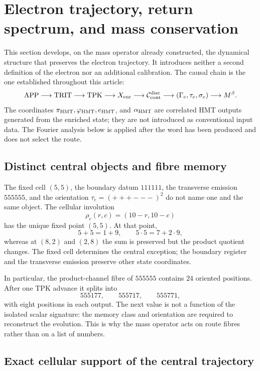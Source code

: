 \section{Electron trajectory, return spectrum, and mass conservation}
\label{vi:sec:trayectoria-espectral-masa}

This section develops, on the mass operator already constructed, the
dynamical structure that preserves the electron trajectory. It introduces
neither a second definition of the electron nor an additional calibration.
The causal chain is the one established throughout this article:
\[
 \mathrm{APP}\longrightarrow\mathrm{TRIT}\longrightarrow\mathrm{TPK}
 \longrightarrow X_{\rm enr}
 \longrightarrow\mathcal C_{\rm cont}^{\rm disc}
 \longrightarrow (\Gamma_e,\tau_e,\sigma_e)
 \longrightarrow M^\beta .
\]
The coordinates $\pi_{\rm HMT},\varphi_{\rm HMT},e_{\rm HMT}$, and
$\alpha_{\rm HMT}$ are correlated HMT outputs generated from the enriched
state; they are not introduced as conventional input data. The Fourier analysis
below is applied after the word has been produced and does not select the route.

\subsection{Distinct central objects and fibre memory}

The fixed cell $(5,5)$, the boundary datum $111111$, the transverse emission
$555555$, and the orientation $\tau_e=(+++---)^2$ do not name one and the
same object. The cellular involution
\[
 \rho_c(r,c)=(10-r,10-c)
\]
has the unique fixed point $(5,5)$. At that point,
\[
 5+5=1+9,\qquad 5\cdot5=7+2\cdot9,
\]
whereas at $(8,2)$ and $(2,8)$ the sum is preserved but the product quotient
changes. The fixed cell determines the central exception; the boundary
register and the transverse emission preserve other state coordinates.

In particular, the product-channel fibre of $555555$ contains $24$ oriented
positions. After one TPK advance it splits into
\[
 555177,\qquad 555717,\qquad 555771,
\]
with eight positions in each output. The next value is not a function of the
isolated scalar signature: the memory class and orientation are required to
reconstruct the evolution. This is why the mass operator acts on route fibres
rather than on a list of numbers.

\subsection{Exact cellular support of the central trajectory}

